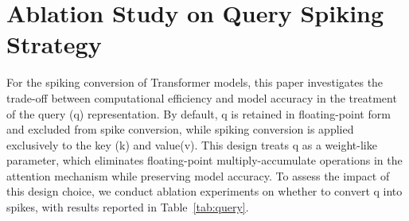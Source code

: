 \section{Ablation Study on Query Spiking Strategy}
\label{sec:query_ablation}
For the spiking conversion of Transformer models, this paper investigates the trade-off between computational efficiency and model accuracy in the treatment of the query (q) representation. By default, 
q is retained in floating-point form and excluded from spike conversion, while spiking conversion is applied exclusively to the key (k) and value(v). This design treats q as a weight-like parameter, which eliminates floating-point multiply-accumulate operations in the attention mechanism while preserving model accuracy. To assess the impact of this design choice, we conduct ablation experiments on whether to convert q into spikes, with results reported in Table~\ref{tab:query}.

